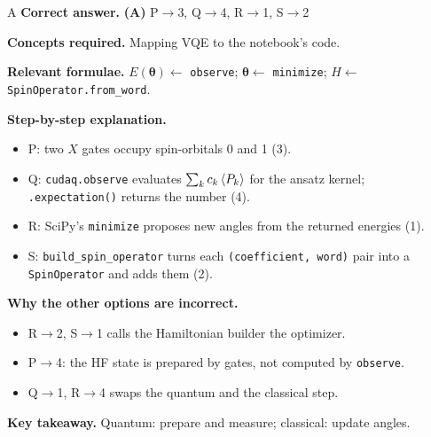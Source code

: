 \documentclass[11pt,a4paper]{article}
\newcommand{\qsep}{\par\vspace{2pt}{\color{black!15}\hrule}\vspace{4pt}}
\begin{document}
\begin{solbox}{A}
\textbf{\color{brand}Correct answer.} \textcolor{okgreen}{\textbf{(A)}} P$\to$3, Q$\to$4, R$\to$1, S$\to$2

\textbf{\color{brand}Concepts required.} Mapping VQE to the notebook's code.

\textbf{\color{brand}Relevant formulae.} $E(\boldsymbol\theta) \leftarrow$ \texttt{observe}; $\boldsymbol\theta \leftarrow$ \texttt{minimize}; $H \leftarrow$ \texttt{SpinOperator.from\_word}.

\textbf{\color{brand}Step-by-step explanation.} \begin{itemize}\itemsep0pt
\item P: two $X$ gates occupy spin-orbitals 0 and 1 (3).
\item Q: \texttt{cudaq.observe} evaluates $\sum_kc_k\braket{P_k}$ for the ansatz kernel; \texttt{.expectation()} returns the number (4).
\item R: SciPy's \texttt{minimize} proposes new angles from the returned energies (1).
\item S: \texttt{build\_spin\_operator} turns each \texttt{(coefficient, word)} pair into a \texttt{SpinOperator} and adds them (2).
\end{itemize}

\textbf{\color{brand}Why the other options are incorrect.}
\begin{itemize}[leftmargin=2.4em, itemsep=1pt, topsep=2pt]
\item[\textbf{(B)}] R$\to$2, S$\to$1 calls the Hamiltonian builder the optimizer.
\item[\textbf{(C)}] P$\to$4: the HF state is prepared by gates, not computed by \texttt{observe}.
\item[\textbf{(D)}] Q$\to$1, R$\to$4 swaps the quantum and the classical step.
\end{itemize}
\textbf{\color{brand}Key takeaway.} Quantum: prepare and measure; classical: update angles.
\end{solbox}
\qsep
\end{document}
